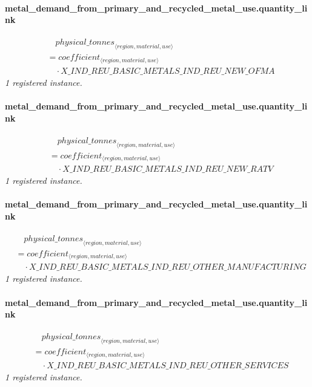 \documentclass[11pt]{article}
\begin{document}
\paragraph{metal\_demand\_from\_primary\_and\_recycled\_metal\_use.quantity\_link}
\begin{align*}
&\quad {physical\_tonnes}_{\langle region, material, use\rangle}\\
&= coefficient_{\langle region, material, use\rangle}\\
&\quad {}\cdot X\_IND\_REU\_BASIC\_METALS\_IND\_REU\_NEW\_OFMA
\end{align*}
\noindent\emph{1 registered instance.}\par
\paragraph{metal\_demand\_from\_primary\_and\_recycled\_metal\_use.quantity\_link}
\begin{align*}
&\quad {physical\_tonnes}_{\langle region, material, use\rangle}\\
&= coefficient_{\langle region, material, use\rangle}\\
&\quad {}\cdot X\_IND\_REU\_BASIC\_METALS\_IND\_REU\_NEW\_RATV
\end{align*}
\noindent\emph{1 registered instance.}\par
\paragraph{metal\_demand\_from\_primary\_and\_recycled\_metal\_use.quantity\_link}
\begin{align*}
&\quad {physical\_tonnes}_{\langle region, material, use\rangle}\\
&= coefficient_{\langle region, material, use\rangle}\\
&\quad {}\cdot X\_IND\_REU\_BASIC\_METALS\_IND\_REU\_OTHER\_MANUFACTURING
\end{align*}
\noindent\emph{1 registered instance.}\par
\paragraph{metal\_demand\_from\_primary\_and\_recycled\_metal\_use.quantity\_link}
\begin{align*}
&\quad {physical\_tonnes}_{\langle region, material, use\rangle}\\
&= coefficient_{\langle region, material, use\rangle}\\
&\quad {}\cdot X\_IND\_REU\_BASIC\_METALS\_IND\_REU\_OTHER\_SERVICES
\end{align*}
\noindent\emph{1 registered instance.}\par
\end{document}
